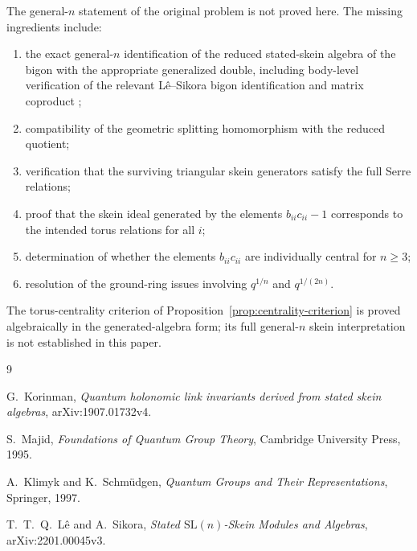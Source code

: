 \documentclass[12pt]{article}
\theoremstyle{plain}
\theoremstyle{definition}
\numberwithin{equation}{section}
\begin{document}
The general-\(n\) statement of the original problem is not proved here.  The missing ingredients include:
\begin{enumerate}[label=(\arabic*)]
\item the exact general-\(n\) identification of the reduced stated-skein algebra of the bigon with the appropriate generalized double, including body-level verification of the relevant Lê--Sikora bigon identification and matrix coproduct \cite{LeSikora};
\item compatibility of the geometric splitting homomorphism with the reduced quotient;
\item verification that the surviving triangular skein generators satisfy the full Serre relations;
\item proof that the skein ideal generated by the elements \(b_{ii}c_{ii}-1\) corresponds to the intended torus relations for all \(i\);
\item determination of whether the elements \(b_{ii}c_{ii}\) are individually central for \(n\ge 3\);
\item resolution of the ground-ring issues involving \(q^{1/n}\) and \(q^{1/(2n)}\).
\end{enumerate}
The torus-centrality criterion of Proposition~\ref{prop:centrality-criterion} is proved algebraically in the generated-algebra form; its full general-\(n\) skein interpretation is not established in this paper.

\begin{thebibliography}{9}

G.~Korinman,
\emph{Quantum holonomic link invariants derived from stated skein algebras},
arXiv:1907.01732v4.

S.~Majid,
\emph{Foundations of Quantum Group Theory},
Cambridge University Press, 1995.

A.~Klimyk and K.~Schmüdgen,
\emph{Quantum Groups and Their Representations},
Springer, 1997.

T.~T.~Q.~Lê and A.~Sikora,
\emph{Stated \(\mathrm{SL}(n)\)-Skein Modules and Algebras},
arXiv:2201.00045v3.

\end{thebibliography}
\end{document}
